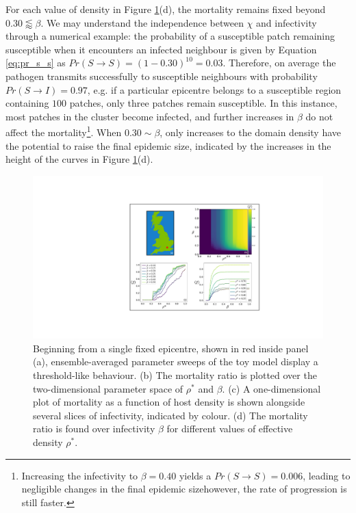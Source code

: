 For each value of density in Figure \ref{fig:heterogeneous-phase-space}(d), 
the mortality remains fixed beyond $0.30 \lessapprox \beta$.
We may understand the independence between $\chi$ and infectivity through a numerical example:
the probability of a susceptible patch remaining susceptible when it encounters 
an infected neighbour is given by Equation \ref{eq:pr_s_s} as $Pr(S \rightarrow S) = (1 - 0.30)^{10} = 0.03$. 
Therefore, on average the pathogen transmits successfully to susceptible neighbours with probability $Pr(S\rightarrow I)=0.97$, 
e.g. if a particular epicentre belongs to a susceptible region containing $100$ patches, only three patches remain susceptible. 
In this instance, most patches in the cluster become infected, and further increases in $\beta$ do not affect the 
mortality\footnote{
Increasing the infectivity to $\beta=0.40$ yields a $Pr(S \rightarrow S) = 0.006$, 
leading to negligible changes in the final epidemic size\textemdash however, the rate of progression is still faster.
}. 
When $0.30 \sim \beta$, only increases to the domain density have the potential to raise the final epidemic size, 
indicated by the increases in the height of the curves in Figure \ref{fig:heterogeneous-phase-space}(d). 

\begin{figure}
    \centering
    \includegraphics[scale=0.55]{chapter4/figures/figure4-param-sweeps.pdf}
    \caption{
    Beginning from a single fixed epicentre, shown in red inside panel (a),
    ensemble-averaged parameter sweeps of the toy model display a threshold-like behaviour.
    (b) The mortality ratio is plotted over the two-dimensional parameter space of $\rho^*$ and $\beta$. 
    (c) A one-dimensional plot of mortality as a function of host density is shown alongside several slices of infectivity, indicated by colour.
    (d) The mortality ratio is found over infectivity $\beta$ for different values of effective density $\rho^{*}$.
    }
    \label{fig:heterogeneous-phase-space}
\end{figure}

